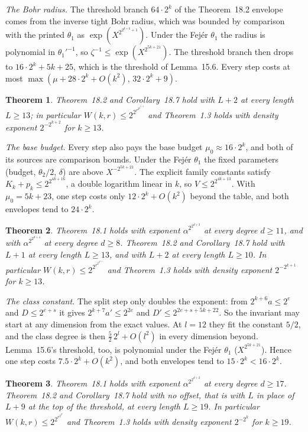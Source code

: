 \documentclass[11pt]{article}
\newtheorem{theorem}{Theorem}
\theoremstyle{definition}
\theoremstyle{remark}
\begin{document}
\emph{The Bohr radius.} The threshold branch $64\cdot2^k$ of the
Theorem~18.2 envelope comes from the inverse tight Bohr radius, which was
bounded by comparison with the printed $\theta_1$ as
$\exp(X^{2^{2^{k+6}+1}})$. Under the Fej\'er $\theta_1$ the radius is
polynomial in $\theta_1'^{-1}$, so $\zeta^{-1}\le\exp(X^{2^{5k+21}})$. The
threshold branch then drops to $16\cdot2^k+5k+25$, which is the threshold of
Lemma~15.6. Every step costs at most $\max(\mu+28\cdot2^k+O(k^2),\,
32\cdot2^k+9)$.

\begin{theorem}\label{thm:fejer2}
Theorem~18.2 and Corollary~18.7 hold with $L+2$ at every length $L\ge13$; in
particular $W(k,r)\le2^{2^{r^{2^{2^{k+2}}}}}$ and Theorem~1.3 holds with
density exponent $2^{-2^{k+2}}$ for $k\ge13$.
\end{theorem}

\emph{The base budget.} Every step also pays the base budget
$\mu_0\approx16\cdot2^k$, and both of its sources are comparison bounds.
Under the Fej\'er $\theta_1$ the fixed parameters (budget, $\theta_2/2$,
$\delta$) are above $X^{-2^{5k+21}}$. The explicit family constants satisfy
$K_k+p_k\le2^{2^{4k+16}}$, a double logarithm linear in $k$, so
$V\le2^{2^{4k+13}}$. With $\mu_0=5k+23$, one step costs only
$12\cdot2^k+O(k^2)$ beyond the table, and both envelopes tend to
$24\cdot2^k$.

\begin{theorem}\label{thm:fejer3}
Theorem~18.1 holds with exponent $\alpha^{2^{2^{d+3}}}$ at every degree
$d\ge11$, and with $\alpha^{2^{2^{d+4}}}$ at every degree $d\ge8$.
Theorem~18.2 and Corollary~18.7 hold with $L+1$ at every length $L\ge13$, and
with $L+2$ at every length $L\ge10$. In particular
$W(k,r)\le2^{2^{r^{2^{2^{k+1}}}}}$ and Theorem~1.3 holds with density exponent
$2^{-2^{k+1}}$ for $k\ge13$.
\end{theorem}

\emph{The class constant.} The split step only doubles the exponent: from
$2^{k+6}a\le2^e$ and $D\le2^{e+s}$ it gives $2^{k+7}a'\le2^{2e}$ and
$D'\le2^{2e+s+5k+22}$. So the invariant may start at any dimension from the
exact values. At $l=12$ they fit the constant $5/2$, and the class degree is
then $\tfrac52\,2^l+O(l^2)$ in every dimension beyond. Lemma~15.6's
threshold, too, is polynomial under the Fej\'er $\theta_1$
($X^{2^{5k+21}}$). Hence one step costs $7.5\cdot2^k+O(k^2)$, and both
envelopes tend to $15\cdot2^k<16\cdot2^k$.

\begin{theorem}\label{thm:fejer2d}
Theorem~18.1 holds with exponent $\alpha^{2^{2^{d+2}}}$ at every degree
$d\ge17$. Theorem~18.2 and Corollary~18.7 hold with no offset, that is with $L$
in place of $L+9$ at the top of the threshold, at every length $L\ge19$. In
particular $W(k,r)\le2^{2^{r^{2^{2^{k}}}}}$ and Theorem~1.3 holds with density
exponent $2^{-2^{k}}$ for $k\ge19$.
\end{theorem}
\end{document}
